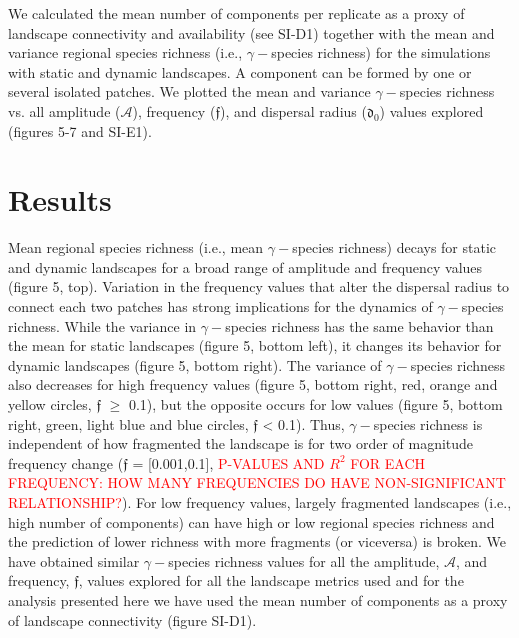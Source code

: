 \documentclass[12pt]{article}
\newcommand{\carlos}[1]{\textcolor{Red}{#1}}
\begin{document}
We calculated the mean number of components per replicate as a proxy of landscape connectivity and availability (see SI-D1) together with the mean and variance regional species richness (i.e., $\gamma-$species richness) for the simulations with
static and dynamic landscapes. A component can be formed by one or several isolated patches. We plotted the mean and variance
$\gamma-$species richness vs. all amplitude ($\mathcal{A}$), frequency ($\mathfrak{f}$), and dispersal radius ($\mathfrak{d_{0}}$) values explored (figures 5-7 and SI-E1). 

\section*{Results}

Mean regional species richness (i.e., mean $\gamma-$species richness) decays for static and dynamic landscapes for a broad range of amplitude and frequency values (figure 5, top). Variation in the frequency values that alter the dispersal radius to connect each two patches has strong implications for the dynamics of $\gamma-$species richness. While the variance in $\gamma-$species richness has the same behavior than the mean for static landscapes (figure 5, bottom left), it changes its behavior for dynamic landscapes (figure 5, bottom right). The variance of $\gamma-$species richness also decreases for high frequency values (figure 5, bottom right, red, orange and yellow circles, $\mathfrak{f}$ $\geq$ 0.1), but the opposite occurs for low values (figure 5, bottom right, green, light blue and blue circles, $\mathfrak{f}$ < 0.1). Thus, $\gamma-$species richness is independent of how fragmented the landscape is for two order of magnitude frequency change ($\mathfrak{f}$ = [0.001,0.1], \carlos{P-VALUES AND $R^2$ FOR EACH FREQUENCY: HOW MANY FREQUENCIES DO HAVE NON-SIGNIFICANT RELATIONSHIP?}). For low frequency values, largely fragmented landscapes (i.e., high number of components) can have high or low regional species richness and the prediction of lower richness with more fragments (or viceversa) is broken. We have obtained similar $\gamma-$species richness values for all the amplitude, $\mathcal{A}$, and frequency, $\mathfrak{f}$, values explored for all the landscape metrics used and for the analysis presented here we have used the mean number of components as a proxy of landscape connectivity (figure SI-D1).
\end{document}
